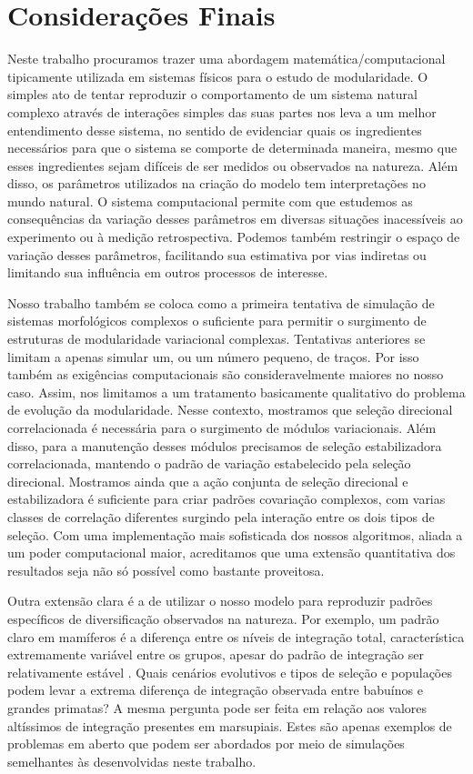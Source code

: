 \pagestyle{empty}
\cleardoublepage
\pagestyle{fancy}
\chapter{Considerações Finais}
\label{cap5}

Neste trabalho procuramos trazer uma abordagem matemática/computacional
tipicamente utilizada em sistemas físicos para o estudo de
modularidade. 
O simples ato de tentar reproduzir o comportamento de um sistema natural
complexo através de interações simples das suas partes nos leva a um melhor
entendimento desse sistema, no sentido de evidenciar quais os
ingredientes necessários para que o sistema se comporte de determinada
maneira, mesmo que esses ingredientes sejam difíceis de ser medidos ou
observados na natureza. 
Além disso, os parâmetros utilizados na criação do modelo tem
interpretações no mundo natural. 
O sistema computacional permite com que estudemos as consequências da
variação desses parâmetros em diversas situações inacessíveis ao
experimento ou à medição retrospectiva. 
Podemos também restringir o espaço de variação desses parâmetros,
facilitando sua estimativa por vias indiretas ou limitando sua
influência em outros processos de interesse. 

Nosso trabalho também se coloca como a primeira tentativa de simulação
de sistemas morfológicos complexos o suficiente para permitir o
surgimento de estruturas de modularidade variacional complexas. 
Tentativas anteriores se limitam a apenas simular um, ou um número
pequeno, de traços. 
Por isso também as exigências computacionais são consideravelmente
maiores no nosso caso. 
Assim, nos limitamos a um tratamento basicamente qualitativo do problema
de evolução da modularidade. 
Nesse contexto, mostramos que seleção direcional correlacionada é
necessária para o surgimento de módulos variacionais. 
Além disso, para a manutenção desses módulos precisamos de seleção
estabilizadora correlacionada, mantendo o padrão de variação
estabelecido pela seleção direcional.
Mostramos ainda que a ação conjunta de seleção direcional e
estabilizadora é suficiente para criar padrões covariação complexos, com
varias classes de correlação diferentes surgindo pela interação entre
os dois tipos de seleção.
Com uma implementação mais sofisticada dos
nossos algoritmos, aliada a um poder computacional maior, acreditamos
que uma extensão quantitativa dos resultados seja não só possível como
bastante proveitosa. 

Outra extensão clara é a de utilizar o nosso modelo para reproduzir
padrões específicos de diversificação observados na natureza. 
Por exemplo, um padrão claro em mamíferos é a diferença entre os níveis
de integração total, característica extremamente variável entre os
grupos, apesar do padrão de integração ser relativamente estável
\cite{Porto2008}. 
Quais cenários evolutivos e tipos de seleção e populações podem levar a
extrema diferença de integração observada entre babuínos e grandes
primatas?
A mesma pergunta pode ser feita em relação aos valores altíssimos de
integração presentes em marsupiais. 
Estes são apenas exemplos de problemas em aberto que podem ser abordados
por meio de simulações semelhantes às desenvolvidas neste trabalho. 

